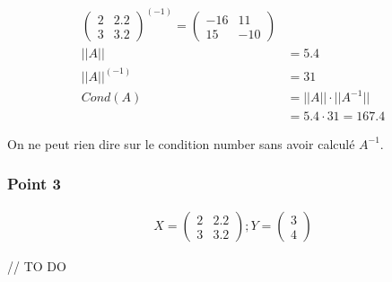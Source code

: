 \begin{equation}
	\begin{aligned}
		\begin{pmatrix}
			2 & 2.2\\
			3 & 3.2
		\end{pmatrix}^{(-1)} = 
		\begin{pmatrix}
			-16 & 11\\
			15 & -10
		\end{pmatrix}\\
		||A|| &= 5.4\\
		||A||^{(-1)} &= 31\\
		Cond (A) &= ||A|| \cdot ||A^{-1}||\\
		&= 5.4 \cdot 31 = 167.4
	\end{aligned}
\end{equation}

On ne peut rien dire sur le condition number sans avoir calculé $A^{-1}$.

\subsubsection{Point 3}

\begin{equation}
	\begin{aligned}X = 
		\begin{pmatrix}
			2 & 2.2\\
			3 & 3.2
		\end{pmatrix}; Y = 
		\begin{pmatrix}
			3\\
			4
		\end{pmatrix}
	\end{aligned}
\end{equation}

// TO DO